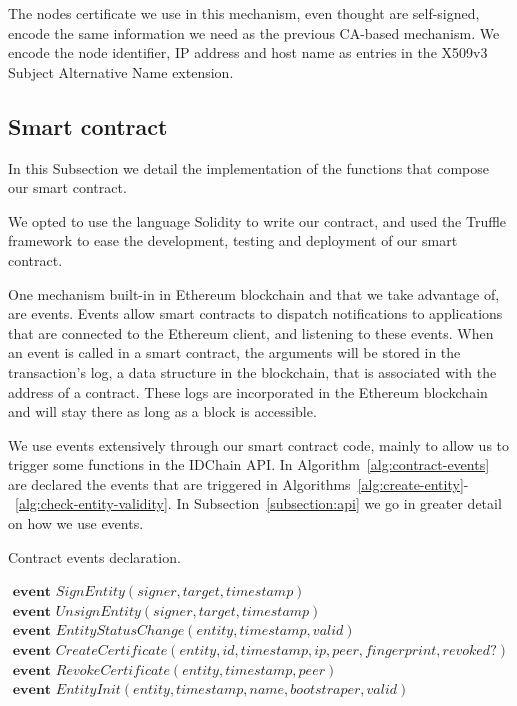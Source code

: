 The nodes certificate we use in this mechanism, even thought are self-signed, encode the same information we need as the previous CA-based mechanism.
We encode the node identifier, IP address and host name as entries in the X509v3 Subject Alternative Name extension.

\subsection{Smart contract}\label{subsection:smart-contract}

In this Subsection we detail the implementation of the functions that compose our smart contract.

We opted to use the language Solidity to write our contract, and used the Truffle framework to ease the development, testing and deployment of our smart contract.

One mechanism built-in in Ethereum blockchain and that we take advantage of, are events.
Events allow smart contracts to dispatch notifications to applications that are connected to the Ethereum client, and listening to these events.
When an event is called in a smart contract, the arguments will be stored in the transaction's log, a data structure in the blockchain, that is associated with the address of a contract.
These logs are incorporated in the Ethereum blockchain and will stay there as long as a block is accessible.

We use events extensively through our smart contract code, mainly to allow us to trigger some functions in the IDChain API.
In Algorithm~\ref{alg:contract-events} are declared the events that are triggered in Algorithms~\ref{alg:create-entity}-~\ref{alg:check-entity-validity}.
In Subsection~\ref{subsection:api} we go in greater detail on how we use events.

\begin{algorithm}
  \caption{Contract events declaration.}
  \label{alg:contract-events}
  \begin{algorithmic}
    \State $\textbf{ event } SignEntity(signer, target, timestamp)$
    \State $\textbf{ event } UnsignEntity(signer, target, timestamp)$
    \State $\textbf{ event } EntityStatusChange(entity, timestamp, valid)$
    \State $\textbf{ event } CreateCertificate(entity, id, timestamp, ip, peer, fingerprint, revoked?)$
    \State $\textbf{ event } RevokeCertificate(entity, timestamp, peer)$
    \State $\textbf{ event } EntityInit(entity, timestamp, name, bootstraper, valid)$
  \end{algorithmic}
\end{algorithm}

